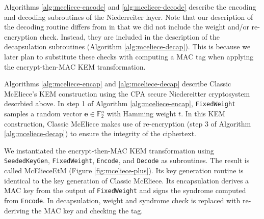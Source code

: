 \documentclass[runningheads]{llncs}
\begin{document}
Algorithms \ref{alg:mceliece-encode} and \ref{alg:mceliece-decode} describe the encoding and decoding subroutines of the Niederreiter layer. Note that our description of the decoding routine differs from \cite{ClassicMcEliece2022} in that we did not include the weight and/or re-encryption check. Instead, they are included in the description of the decapsulation subroutines (Algorithm \ref{alg:mceliece-decap}). This is because we later plan to substitute these checks with computing a MAC tag when applying the encrypt-then-MAC KEM transformation.

Algorithms \ref{alg:mceliece-encap} and \ref{alg:mceliece-decap} describe Classic McEliece's KEM construction using the CPA secure Niedereitter cryptosystem descrbied above. In step 1 of Algorithm \ref{alg:mceliece-encap}, \texttt{FixedWeight} samples a random vector $\mathbf{e}\in\mathbb{F}_2^n$ with Hamming weight $t$. In this KEM construction, Classic McEliece makes use of re-encryption (step 3 of Algorithm \ref{alg:mceliece-decap}) to ensure the integrity of the ciphertext.

We instantiated the encrypt-then-MAC KEM transformation using \\ \texttt{SeededKeyGen}, \texttt{FixedWeight}, \texttt{Encode}, and \texttt{Decode} as subroutines. The result is called McElieceEtM (Figure \ref{fig:mceliece-plus}). Its key generation routine is identical to the key generation of Classic McEliece. Its encapsulation derives a MAC key from the output of \texttt{FixedWeight} and signs the syndrome computed from \texttt{Encode}. In decapsulation, weight and syndrome check is replaced with re-deriving the MAC key and checking the tag.
\end{document}
